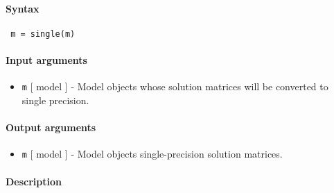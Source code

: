 


	\paragraph{Syntax}
 
 \begin{verbatim}
 m = single(m)
 \end{verbatim}
 
 \paragraph{Input arguments}
 
 \begin{itemize}
 \item
   \texttt{m} {[} model {]} - Model objects whose solution matrices will
   be converted to single precision.
 \end{itemize}
 
 \paragraph{Output arguments}
 
 \begin{itemize}
 \item
   \texttt{m} {[} model {]} - Model objects single-precision solution
   matrices.
 \end{itemize}
 
 \paragraph{Description}


